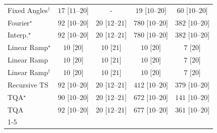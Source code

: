 \begin{tabular}{l|cccc|}
Fixed Angles$^\dagger$ & {\cellcolor[HTML]{F4FBF2}} \color[HTML]{000000} $17$ [$11$--$20$] & {\cellcolor[HTML]{000000}} \color[HTML]{F1F1F1} {\cellcolor{white}} \color{black} - & {\cellcolor[HTML]{F4FBF2}} \color[HTML]{000000} $19$ [$10$--$20$] & {\cellcolor[HTML]{ECF8E8}} \color[HTML]{000000} $60$ [$10$--$20$] \\
Fourier$^\star$ & {\cellcolor[HTML]{E7F6E2}} \color[HTML]{000000} $92$ [$10$--$20$] & {\cellcolor[HTML]{F4FBF1}} \color[HTML]{000000} $20$ [$12$--$21$] & {\cellcolor[HTML]{00441B}} \color[HTML]{F1F1F1} $780$ [$10$--$20$] & {\cellcolor[HTML]{78C679}} \color[HTML]{000000} $382$ [$10$--$20$] \\
Interp.$^\star$ & {\cellcolor[HTML]{E7F6E2}} \color[HTML]{000000} $92$ [$10$--$20$] & {\cellcolor[HTML]{F4FBF1}} \color[HTML]{000000} $20$ [$12$--$21$] & {\cellcolor[HTML]{00441B}} \color[HTML]{F1F1F1} $780$ [$10$--$20$] & {\cellcolor[HTML]{78C679}} \color[HTML]{000000} $382$ [$10$--$20$] \\
Linear Ramp$^\star$ & {\cellcolor[HTML]{F6FCF4}} \color[HTML]{000000} $10$ [$20$] & {\cellcolor[HTML]{F6FCF4}} \color[HTML]{000000} $10$ [$21$] & {\cellcolor[HTML]{F6FCF4}} \color[HTML]{000000} $10$ [$20$] & {\cellcolor[HTML]{F6FCF4}} \color[HTML]{000000} $7$ [$20$] \\
Linear Ramp & {\cellcolor[HTML]{F6FCF4}} \color[HTML]{000000} $10$ [$20$] & {\cellcolor[HTML]{F6FCF4}} \color[HTML]{000000} $10$ [$21$] & {\cellcolor[HTML]{F6FCF4}} \color[HTML]{000000} $10$ [$20$] & {\cellcolor[HTML]{F6FCF4}} \color[HTML]{000000} $7$ [$20$] \\
Linear Ramp$^\dagger$ & {\cellcolor[HTML]{F6FCF4}} \color[HTML]{000000} $10$ [$20$] & {\cellcolor[HTML]{F6FCF4}} \color[HTML]{000000} $10$ [$21$] & {\cellcolor[HTML]{F6FCF4}} \color[HTML]{000000} $10$ [$20$] & {\cellcolor[HTML]{F6FCF4}} \color[HTML]{000000} $7$ [$20$] \\
Recursive TS & {\cellcolor[HTML]{E7F6E2}} \color[HTML]{000000} $92$ [$10$--$20$] & {\cellcolor[HTML]{F4FBF1}} \color[HTML]{000000} $20$ [$12$--$21$] & {\cellcolor[HTML]{68BE70}} \color[HTML]{000000} $412$ [$10$--$20$] & {\cellcolor[HTML]{79C67A}} \color[HTML]{000000} $379$ [$10$--$20$] \\
TQA$^\star$ & {\cellcolor[HTML]{E7F6E2}} \color[HTML]{000000} $90$ [$10$--$20$] & {\cellcolor[HTML]{F4FBF1}} \color[HTML]{000000} $20$ [$12$--$21$] & {\cellcolor[HTML]{03702E}} \color[HTML]{F1F1F1} $672$ [$10$--$20$] & {\cellcolor[HTML]{D8F0D2}} \color[HTML]{000000} $141$ [$10$--$20$] \\
TQA & {\cellcolor[HTML]{E7F6E2}} \color[HTML]{000000} $92$ [$10$--$20$] & {\cellcolor[HTML]{F4FBF1}} \color[HTML]{000000} $20$ [$12$--$21$] & {\cellcolor[HTML]{016E2D}} \color[HTML]{F1F1F1} $677$ [$10$--$20$] & {\cellcolor[HTML]{81CA81}} \color[HTML]{000000} $361$ [$10$--$20$] \\
\cline{1-5}
\bottomrule
\end{tabular}
